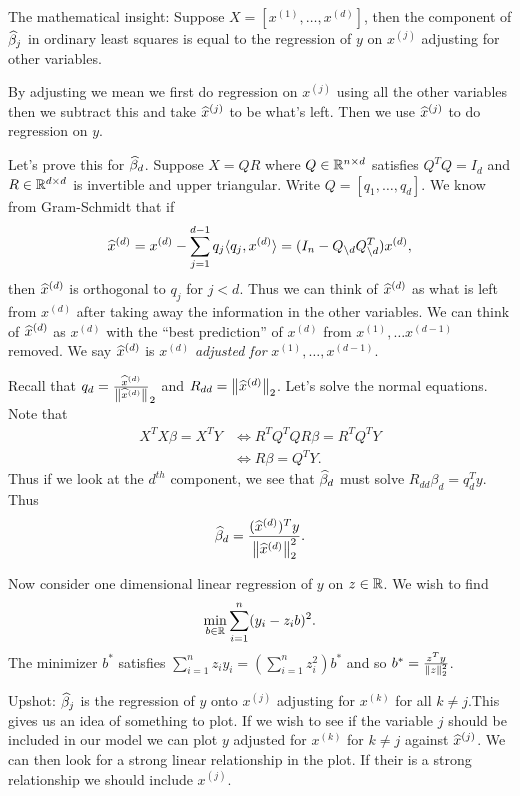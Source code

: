 The mathematical insight: Suppose $X = [x^{(1)},\ldots, x^{(d)}]$, then the component of $\widehat{\beta}_j$ in ordinary least squares is equal to the regression of $y$ on $x^{(j)}$ adjusting for other variables.

By adjusting we mean we first do regression on $x^{(j)}$ using all the other variables then we subtract this and take $\widehat{x}^{(j)}$ to be what's left. Then we use $\widehat{x}^{(j)}$ to do regression on $y$.

Let's prove this for $\widehat{\beta}_d$. Suppose $X = QR$ where $Q \in {\mathbb R}^{n\times d}$ satisfies $Q^TQ = I_d$ and $R\in {\mathbb R}^{d\times d}$ is invertible and upper triangular. Write $Q=[q_1,\ldots,q_d]$. We know from Gram-Schmidt that if
\[\widehat{x}^{(d)} = x^{(d)} - \sum_{j=1}^{d-1}q_j\langle q_j,x^{(d)}\rangle = (I_n-Q_{\setminus d}Q_{\setminus d}^T)x^{(d)}, \]
then $\widehat{x}^{(d)}$ is orthogonal to $q_j$ for $j< d$. Thus we can think of $\widehat{x}^{(d)}$ as what is left from $x^{(d)}$ after taking away the information in the other variables. We can think of $\widehat{x}^{(d)}$ as $x^{(d)}$ with the ``best prediction'' of $x^{(d)}$ from $x^{(1)},\ldots x^{(d-1)}$ removed. We say $\widehat{x}^{(d)}$ is $x^{(d)}$ \emph{adjusted for} $x^{(1)},\ldots, x^{(d-1)}$.

Recall that $q_d = \frac{\widehat{x}^{(d)}}{\left\|\widehat{x}^{(d)}\right\|}_2$ and $R_{dd} = \left\|\widehat{x}^{(d)}\right\|_2$. Let's solve the normal equations. Note that
\begin{align*}
    X^TX\beta = X^TY & \Longleftrightarrow R^TQ^TQR\beta = R^TQ^TY\\
    &\Longleftrightarrow R\beta = Q^T Y.
\end{align*}
Thus if we look at the $d^{th}$ component, we see that $\widehat{\beta}_d$ must solve $R_{dd}\beta_d = q_d^Ty$. Thus \[\widehat{\beta}_d =\frac{(\widehat{x}^{(d)})^Ty}{\left\|\widehat{x}^{(d)}\right\|_2^2}.\] 

Now consider one dimensional linear regression of $y$ on $z \in {\mathbb R}$. We wish to find 
\[\min_{b \in {\mathbb R}} \sum_{i=1}^n (y_i-z_ib)^2. \]
The minimizer $b^*$ satisfies $\sum_{i=1}^n z_iy_i = \left(\sum_{i=1}^n z_i^2\right)b^*$ and so $b^* = \frac{z^Ty}{\left\|z\right\|_2^2}$. 

Upshot: $\widehat{\beta}_j$ is the regression of $y$ onto $x^{(j)}$ adjusting for $x^{(k)}$ for all $k \neq j$.This gives us an idea of something to plot. If we wish to see if the variable $j$ should be included in our model we can plot $y$ adjusted for $x^{(k)}$ for $k \neq j$ against $\widehat{x}^{(j)}$. We can then look for a strong linear relationship in the plot. If their is a strong relationship we should include $x^{(j)}$.
